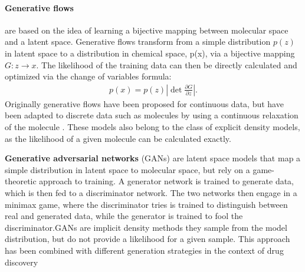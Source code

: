 \paragraph{Generative flows} \citep{rezendeVariationalInferenceNormalizing2016} are based on the idea of learning a bijective mapping between molecular
space and a latent space. Generative flows transform from a simple distribution $p(z)$ in latent space
to a distribution in chemical space, p(x), via a bijective mapping $G: z \rightarrow x$.
The likelihood of the training data can then be directly calculated and optimized
via the change of variables formula:
\begin{align}
      p(x) = p(z) \left| \det \frac{\partial G}{\partial z} \right|.
\end{align}
Originally generative flows have been proposed for continuous data, but have been adapted to
discrete data such as molecules by using a continuous relaxation of the molecule
\citep{madhawaGraphNVPInvertibleFlow2019}. These models also belong to the class of explicit density
models, as the likelihood of a given molecule can be calculated exactly.

\textbf{Generative adversarial networks} (GANs) \citep{goodfellowGenerativeAdversarialNetworks2014}
are latent space models that map a simple distribution in latent space to molecular space, but rely
on a game-theoretic approach to training. A generator network is trained to generate data, which is
then fed to a discriminator network. The two networks then engage in a minimax game, where the
discriminator tries is trained to distinguish between real and generated data, while the generator
is trained to fool the discriminator.\@ \acp{GAN} are implicit density methods they sample from the
model distribution, but do not provide a likelihood for a given sample. This approach has been
combined with different generation strategies in the context of drug discovery \citep{decaoMolGANImplicitGenerative2018,kadurinDruGANAdvancedGenerative2017,guimaraesObjectiveReinforcedGenerativeAdversarial2017,mendez-lucioNovoGenerationHitlike2018}





